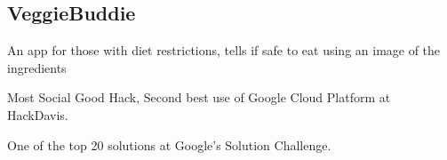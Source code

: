 \documentclass[]{deedy-resume-openfont}
\begin{document}
\begin{minipage}[t]{0.66\textwidth}
\subsection*{VeggieBuddie}
\begin{tightemize}
\item An app for those with diet restrictions, tells if safe to eat using an image of the ingredients
\item Most Social Good Hack, Second best use of Google Cloud Platform at HackDavis.
\item One of the top 20 solutions at Google's Solution Challenge.
\end{tightemize}


\end{minipage} 
\end{document}
